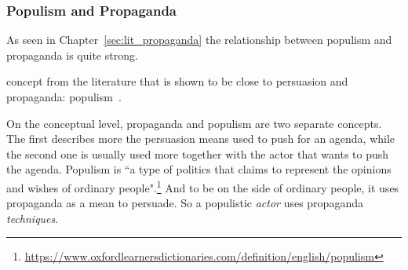 





\subsubsection{\statusorange Populism and Propaganda}

As seen in Chapter~\ref{sec:lit_propaganda} the relationship between populism and propaganda is quite strong.

concept from the literature that is shown to be close to persuasion and propaganda: \gls{populism}~\citep{tumber2021routledge,pasquino2008populism}.

On the conceptual level, propaganda and populism are two separate concepts. The first describes more the persuasion means used to push for an agenda, while the second one is usually used more together with the actor that wants to push the agenda. Populism is ``a type of politics that claims to represent the opinions and wishes of ordinary people".\footnote{\url{https://www.oxfordlearnersdictionaries.com/definition/english/populism}}
And to be on the side of ordinary people, it uses propaganda as a mean to persuade. So a populistic \emph{actor} uses propaganda \emph{techniques}. %

